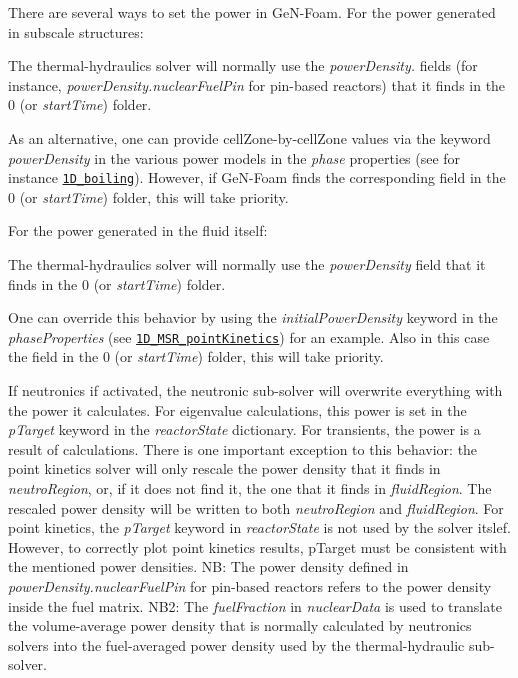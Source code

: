 There are several ways to set the power in Ge\+N-\/\+Foam. For the power generated in subscale structures\+: 
\begin{DoxyItemize}
\item The thermal-\/hydraulics solver will normally use the {\itshape power\+Density.} fields (for instance, {\itshape power\+Density.\+nuclear\+Fuel\+Pin} for pin-\/based reactors) that it finds in the 0 (or {\itshape start\+Time}) folder. 
\item As an alternative, one can provide cell\+Zone-\/by-\/cell\+Zone values via the keyword {\itshape power\+Density} in the various power models in the {\itshape phase} properties (see for instance \href{https://gitlab.com/foam-for-nuclear/GeN-Foam/-/blob/master/Tutorials/1D_boiling/constant/fluidRegion/phaseProperties}{\tt 1\+D\+\_\+boiling}). However, if Ge\+N-\/\+Foam finds the corresponding field in the 0 (or {\itshape start\+Time}) folder, this will take priority. 
\end{DoxyItemize}For the power generated in the fluid itself\+: 
\begin{DoxyItemize}
\item The thermal-\/hydraulics solver will normally use the {\itshape power\+Density} field that it finds in the 0 (or {\itshape start\+Time}) folder. 
\item One can override this behavior by using the {\itshape initial\+Power\+Density} keyword in the {\itshape phase\+Properties} (see \href{https://gitlab.com/foam-for-nuclear/GeN-Foam/-/blob/master/Tutorials/1D_MSR_pointKinetics/rootCase/constant/fluidRegion/phaseProperties}{\tt 1\+D\+\_\+\+M\+S\+R\+\_\+point\+Kinetics}) for an example. Also in this case the field in the 0 (or {\itshape start\+Time}) folder, this will take priority. 
\end{DoxyItemize}If neutronics if activated, the neutronic sub-\/solver will overwrite everything with the power it calculates. For eigenvalue calculations, this power is set in the {\itshape p\+Target} keyword in the {\itshape reactor\+State} dictionary. For transients, the power is a result of calculations. There is one important exception to this behavior\+: the point kinetics solver will only rescale the power density that it finds in {\itshape neutro\+Region}, or, if it does not find it, the one that it finds in {\itshape fluid\+Region}. The rescaled power density will be written to both {\itshape neutro\+Region} and {\itshape fluid\+Region}. For point kinetics, the {\itshape p\+Target} keyword in {\itshape reactor\+State} is not used by the solver itslef. However, to correctly plot point kinetics results, p\+Target must be consistent with the mentioned power densities. NB\+: The power density defined in {\itshape power\+Density.\+nuclear\+Fuel\+Pin} for pin-\/based reactors refers to the power density inside the fuel matrix. N\+B2\+: The {\itshape fuel\+Fraction} in {\itshape nuclear\+Data} is used to translate the volume-\/average power density that is normally calculated by neutronics solvers into the fuel-\/averaged power density used by the thermal-\/hydraulic sub-\/solver. 

